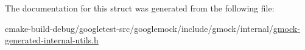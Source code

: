 The documentation for this struct was generated from the following file\+:\begin{DoxyCompactItemize}
\item 
cmake-\/build-\/debug/googletest-\/src/googlemock/include/gmock/internal/\mbox{\hyperlink{gmock-generated-internal-utils_8h}{gmock-\/generated-\/internal-\/utils.\+h}}\end{DoxyCompactItemize}

